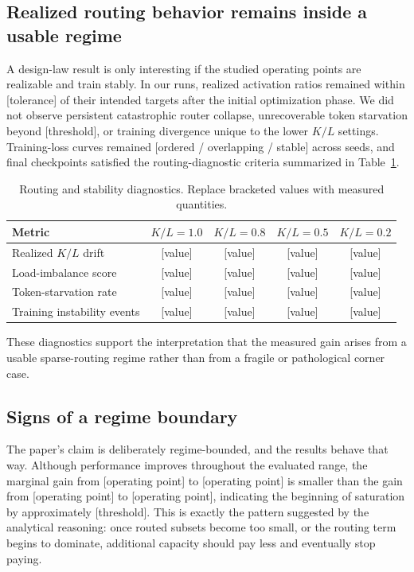 \documentclass[11pt]{article}
\begin{document}
\subsection{Realized routing behavior remains inside a usable regime}

A design-law result is only interesting if the studied operating points are realizable and train stably. In our runs, realized activation ratios remained within [tolerance] of their intended targets after the initial optimization phase. We did not observe persistent catastrophic router collapse, unrecoverable token starvation beyond [threshold], or training divergence unique to the lower $K/L$ settings. Training-loss curves remained [ordered / overlapping / stable] across seeds, and final checkpoints satisfied the routing-diagnostic criteria summarized in Table~\ref{tab:routing_diag}.

\begin{table}[H]
\centering
\caption{Routing and stability diagnostics. Replace bracketed values with measured quantities.}
\label{tab:routing_diag}
\begin{tabular}{lcccc}
\toprule
Metric & $K/L=1.0$ & $K/L=0.8$ & $K/L=0.5$ & $K/L=0.2$ \\
\midrule
Realized $K/L$ drift & [value] & [value] & [value] & [value] \\
Load-imbalance score & [value] & [value] & [value] & [value] \\
Token-starvation rate & [value] & [value] & [value] & [value] \\
Training instability events & [value] & [value] & [value] & [value] \\
\bottomrule
\end{tabular}
\end{table}

These diagnostics support the interpretation that the measured gain arises from a usable sparse-routing regime rather than from a fragile or pathological corner case.

\subsection{Signs of a regime boundary}

The paper's claim is deliberately regime-bounded, and the results behave that way. Although performance improves throughout the evaluated range, the marginal gain from [operating point] to [operating point] is smaller than the gain from [operating point] to [operating point], indicating the beginning of saturation by approximately [threshold]. This is exactly the pattern suggested by the analytical reasoning: once routed subsets become too small, or the routing term begins to dominate, additional capacity should pay less and eventually stop paying.
\end{document}
